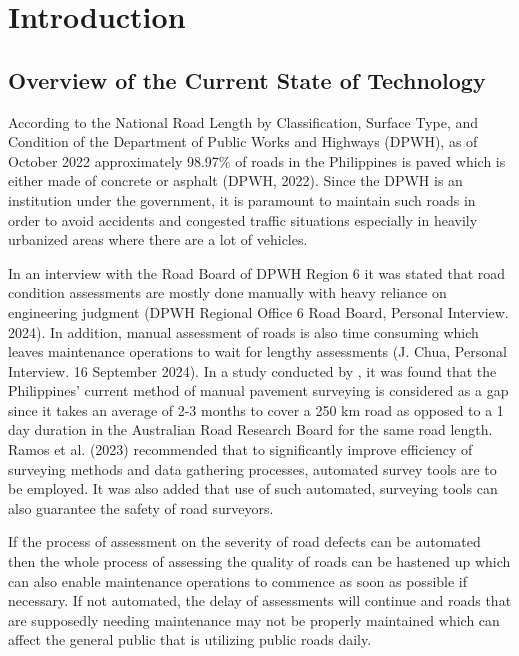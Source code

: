 \chapter{Introduction}
\label{sec:researchdesc}    %

\section{Overview of the Current State of Technology}
\label{sec:overview}

According to the National Road Length by Classification, Surface Type, and Condition of the Department of Public Works and Highways (DPWH), as of October 2022 approximately 98.97\% of roads in the Philippines is paved which is either made of concrete or asphalt (DPWH, 2022). Since the DPWH is an institution under the government, it is paramount to maintain such roads in order to avoid accidents and congested traffic situations especially in heavily urbanized areas where there are a lot of vehicles.

In an interview with the Road Board of DPWH Region 6 it was stated that road condition assessments are mostly done manually with heavy reliance on engineering judgment (DPWH Regional Office 6 Road Board, Personal Interview. 2024). In addition, manual assessment of roads is also time consuming which leaves maintenance operations to wait for lengthy assessments (J. Chua, Personal Interview. 16 September 2024).  In a study conducted by , it was found that the Philippines’ current method of manual pavement surveying is considered as a gap since it takes an average of 2-3 months to cover a 250 km road as opposed to a 1 day duration in the Australian Road Research Board for the same road length. Ramos et al. (2023) recommended that to significantly improve efficiency of surveying methods and data gathering processes, automated survey tools are to be employed. It was also added that use of such automated, surveying tools can also guarantee the safety of road surveyors.

If the process of assessment on the severity of road defects can be automated then the whole process of assessing the quality of roads can be hastened up which can also enable maintenance operations to commence as soon as possible if necessary. If not automated, the delay of assessments will continue and roads that are supposedly needing maintenance may not be properly maintained which can affect the general public that is utilizing public roads daily.

